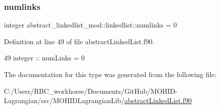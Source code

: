\subsubsection{\texorpdfstring{numlinks}{numlinks}}
{\footnotesize\ttfamily integer abstract\+\_\+linkedlist\+\_\+mod\+::linkedlist\+::numlinks = 0\hspace{0.3cm}{\ttfamily [private]}}



Definition at line 49 of file abstract\+Linked\+List.\+f90.


\begin{DoxyCode}
49         \textcolor{keywordtype}{integer} :: numLinks = 0
\end{DoxyCode}


The documentation for this type was generated from the following file\+:\begin{DoxyCompactItemize}
\item 
C\+:/\+Users/\+R\+B\+C\+\_\+workhorse/\+Documents/\+Git\+Hub/\+M\+O\+H\+I\+D-\/\+Lagrangian/src/\+M\+O\+H\+I\+D\+Lagrangian\+Lib/\mbox{\hyperlink{abstract_linked_list_8f90}{abstract\+Linked\+List.\+f90}}\end{DoxyCompactItemize}
